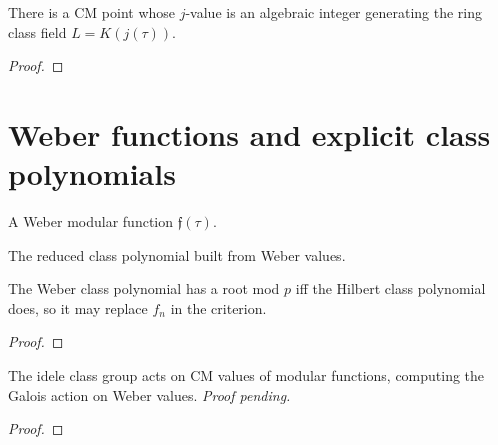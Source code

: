 \begin{theorem}
  \label{thm:j_generates}
  \leanok
  There is a CM point whose $j$-value is an algebraic integer generating the ring
  class field $L = K(j(\tau))$.
\end{theorem}
\begin{proof}
\end{proof}

\section{Weber functions and explicit class polynomials}

\begin{definition}
  \label{def:weber_function}
  \leanok
  A Weber modular function $\mathfrak f(\tau)$.
\end{definition}

\begin{definition}
  \label{def:weber_class_polynomial}
  \leanok
  The reduced class polynomial built from Weber values.
\end{definition}

\begin{theorem}
  \label{thm:weber_root}
  \leanok
  The Weber class polynomial has a root mod $p$ iff the Hilbert class polynomial
  does, so it may replace $f_n$ in the criterion.
\end{theorem}
\begin{proof}
\end{proof}

\begin{theorem}
  \label{thm:shimura}
  \leanok
  The idele class group acts on CM values of modular functions, computing the
  Galois action on Weber values. \emph{Proof pending.}
\end{theorem}
\begin{proof}
\end{proof}
